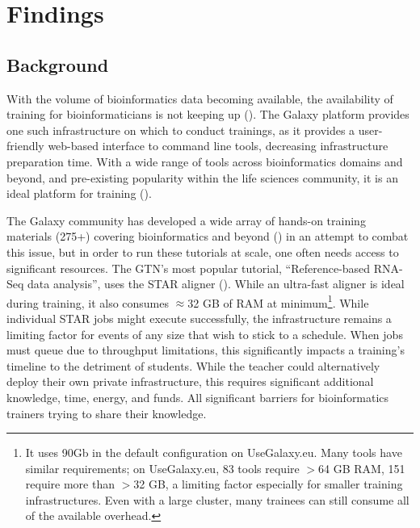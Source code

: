 \documentclass[a4paper,num-refs]{oup-contemporary}
\begin{document}
\section{Findings}
\subsection{Background}


With the volume of bioinformatics data becoming available, the availability of training for bioinformaticians is not keeping up (\cite{Attwood2017}).
The Galaxy platform \cite{afgan2018galaxy} provides one such infrastructure on which to conduct trainings, as it provides a user-friendly web-based interface to command line tools, decreasing infrastructure preparation time. With a wide range of tools across bioinformatics domains and beyond, and pre-existing popularity within the life sciences community, it is an ideal platform for training (\cite{gtn}).

The Galaxy community has developed a wide array of hands-on training materials (275+) covering bioinformatics and beyond (\cite{training-site}) in an attempt to combat this issue, but in order to run these tutorials at scale, one often needs access to significant resources. The GTN's most popular tutorial, ``Reference-based RNA-Seq data analysis'', uses the STAR aligner (\cite{Dobin2012}). While an ultra-fast aligner is ideal during training, it also consumes $\approx$32 GB of RAM at minimum\footnote{It uses 90Gb in the default configuration on UseGalaxy.eu. Many tools have similar requirements; on UseGalaxy.eu, 83 tools require $>$64 GB RAM, 151 require more than $>$32 GB, a limiting factor especially for smaller training infrastructures. Even with a large cluster, many trainees can still consume all of the available overhead.}. While individual STAR jobs might execute successfully, the infrastructure remains a limiting factor for events of any size that wish to stick to a schedule. When jobs must queue due to throughput limitations, this significantly impacts a training's timeline to the detriment of students. While the teacher could alternatively deploy their own private infrastructure, this requires significant additional knowledge, time, energy, and funds. All significant barriers for bioinformatics trainers trying to share their knowledge.
\end{document}
